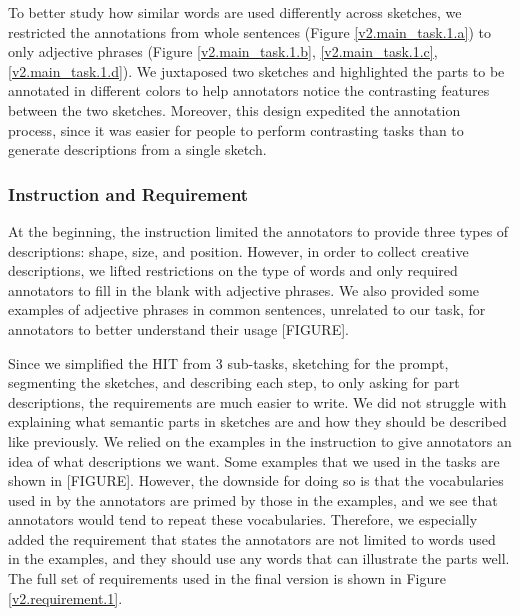 To better study how similar words are used differently across sketches, we restricted the annotations from whole sentences (Figure \ref{v2.main_task.1.a}) to only adjective phrases (Figure \ref{v2.main_task.1.b}, \ref{v2.main_task.1.c}, \ref{v2.main_task.1.d}). 
We juxtaposed two sketches and highlighted the parts to be annotated in different colors to help annotators notice the contrasting features between the two sketches. 
Moreover, this design expedited the annotation process, since it was easier for people to perform contrasting tasks than to generate descriptions from a single sketch. 


\subsubsection{Instruction and Requirement}
At the beginning, the instruction limited the annotators to provide three types of descriptions: shape, size, and position. 
However, in order to collect creative descriptions, we lifted restrictions on the type of words and only required annotators to fill in the blank with adjective phrases. We also provided some examples of adjective phrases in common sentences, unrelated to our task, for annotators to better understand their usage [FIGURE]. 

Since we simplified the HIT from 3 sub-tasks, sketching for the prompt, segmenting the sketches, and describing each step, to only asking for part descriptions, the requirements are much easier to write. 
We did not struggle with explaining what semantic parts in sketches are and how they should be described like previously.  
We relied on the examples in the instruction to give annotators an idea of what descriptions we want. Some examples that we used in the tasks are shown in [FIGURE].
However, the downside for doing so is that the vocabularies used in by the annotators are primed by those in the examples, and we see that annotators would tend to repeat these vocabularies. Therefore, we especially added the requirement that states the annotators are not limited to words used in the examples, and they should use any words that can illustrate the parts well. The full set of requirements used in the final version is shown in Figure \ref{v2.requirement.1}.

